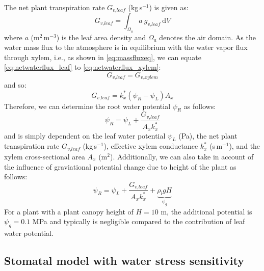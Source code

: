 The net plant transpiration rate $G_{\textit{v,leaf}}$ (kg\,s$^{-1}$) is given as:
\begin{equation}
G_{\textit{v,leaf}} = \int_{\Omega_a} a~g_{\textit{v,leaf}}~\mathrm{d}V
\label{eq:netwaterflux_leaf}
\end{equation}
where $a$ (m$^2$\,m$^{-3}$) is the leaf area density and $\Omega_a$ denotes the air domain. As the water mass flux to the atmosphere is in equilibrium with the water vapor flux through xylem, i.e., as shown in \cref{eq:massfluxeq}, we can equate \cref{eq:netwaterflux_leaf} to \cref{eq:netwaterflux_xylem}:
\begin{equation}
G_{\textit{v,leaf}} = G_{\textit{v,xylem}}
\end{equation}
and so:
\begin{equation}
G_{\textit{v,leaf}} = k_x^* \left( \psi_R - \psi_L \right) A_x
\end{equation}
Therefore, we can determine the root water potential $\psi_R$ as follows:
\begin{equation}
\psi_R = \psi_L  + \frac{G_{\textit{v,leaf}}}{A_x k_x^*}
\end{equation}
and is simply dependent on the leaf water potential $\psi_L$ (Pa), the net plant transpiration rate $G_{\textit{v,leaf}}$ (kg\,s$^{-1}$), effective xylem conductance $k_x^*$ (s\,m$^{-1}$), and the xylem cross-sectional area $A_x$ (m$^2$). Additionally, we can also take in account of the influence of graviational potential change due to height of the plant as follows:
\begin{equation}
\psi_R = \psi_L  + \frac{G_{\textit{v,leaf}}}{A_x k_x^*} + \underbrace{\rho_l g H}_{\psi_g}
\end{equation}
For a plant with a plant canopy height of $H = 10$ m, the additional potential is $\psi_g = 0.1$ MPa and typically is negligible compared to the contribution of leaf water potential.


\subsection{Stomatal model with water stress sensitivity}
\label{subsec:sm}
	
